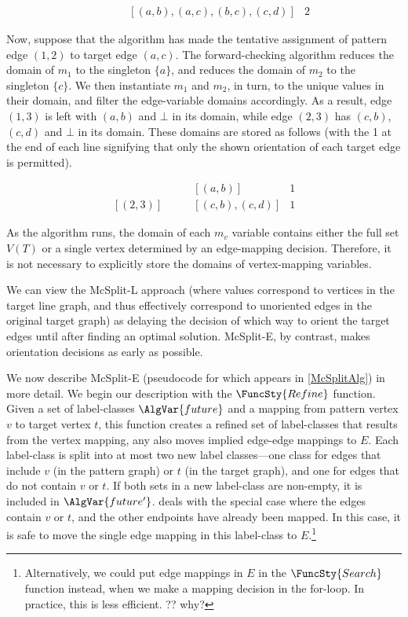 \begin{align*}
    [(1,2), (1,3), (2,3)] & \qquad [(a,b), (a,c), (b,c), (c,d)] & 2
\end{align*}

Now, suppose that the algorithm has made the tentative assignment of pattern edge $(1,2)$ to target edge $(a,c)$.
The forward-checking algorithm reduces the domain of $m_1$ to the singleton $\{a\}$, and reduces
the domain of $m_2$ to the singleton $\{c\}$.  We then instantiate $m_1$ and $m_2$, in turn, to
the unique values in their domain, and filter the edge-variable domains accordingly.  As a result,
edge $(1,3)$ is left with $(a,b)$ and $\bot$ in its domain, while edge $(2,3)$ has $(c,b)$, $(c,d)$
and $\bot$ in its domain.  These domains are stored as follows (with the 1 at the end of
each line signifying that only the shown orientation of each target edge is permitted).

\begin{align*}
    [(1,3)] & \qquad [(a,b)]        & 1 \\
    [(2,3)] & \qquad [(c,b), (c,d)] & 1
\end{align*}

As the algorithm runs, the domain of each $m_v$ variable contains either the full set $V(T)$ or
a single vertex determined by an edge-mapping decision.  Therefore, it is not necessary to explicitly
store the domains of vertex-mapping variables.

We can view the McSplit-L approach (where values correspond to vertices in the target line graph, and
thus effectively correspond to unoriented edges in the original target graph)
as delaying the decision of which way to orient the target
edges until after finding an optimal solution.
McSplit-E, by contrast, makes orientation decisions as early as possible.

We now describe McSplit-E (pseudocode for which appears in \cref{McSplitAlg})
in more detail.
We begin our description with the $\FuncSty{Refine}$ function.  Given a set of label-classes
$\AlgVar{future}$ and a mapping from pattern vertex $v$ to target vertex $t$, this function
creates a refined set of label-classes that results from the vertex mapping,
any also moves implied edge-edge mappings to $E$.  Each label-class is split into at most
two new label classes---one class for edges that include $v$ (in the pattern graph) or $t$
(in the target graph), and one for edges that do not contain $v$ or $t$.  If both sets in a new
label-class are non-empty, it is included in $\AlgVar{future'}$.   deals with the
special case where the edges contain $v$ or $t$, and the other endpoints have already been mapped.
In this case, it is safe to move the single edge mapping in this label-class to $E$.\footnote{Alternatively,
we could put edge mappings in $E$ in the $\FuncSty{Search}$ function instead, when we make a mapping decision
in the for-loop.  In practice, this is less efficient.  ?? why?}

